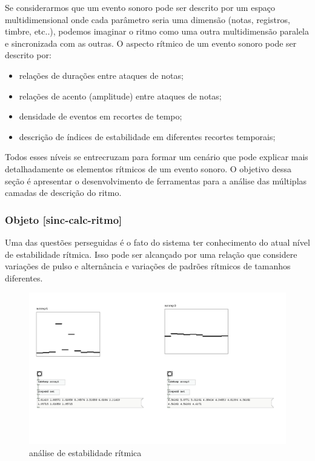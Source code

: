 \documentclass[draft]{ppgmus}
\begin{document}
Se considerarmos que um evento sonoro pode ser descrito por um espaço multidimensional
onde cada parâmetro seria uma dimensão (notas, registros, timbre, etc..), podemos
imaginar o ritmo como uma outra multidimensão paralela e sincronizada com as outras.
O aspecto rítmico de um evento sonoro pode ser descrito por:
\begin{itemize}
 \item relações de durações entre ataques de notas;
\item relações de acento (amplitude) entre ataques de notas;
\item densidade de eventos em recortes de tempo;
\item descrição de índices de estabilidade em diferentes recortes temporais;
\end{itemize}

Todos esses níveis se entrecruzam para formar um cenário que pode explicar mais detalhadamente
os elementos rítmicos de um evento sonoro. O objetivo dessa seção é apresentar o desenvolvimento de
ferramentas para a análise das múltiplas camadas de descrição do ritmo.


% 



\subsubsection{Objeto [sinc-calc-ritmo]}

Uma das questões perseguidas é o fato do sistema ter conhecimento do atual nível de 
estabilidade rítmica. Isso pode ser alcançado por uma relação que considere variações
de pulso e alternância e variações de padrões rítmicos de tamanhos diferentes.

\begin{figure}
\includegraphics[scale=.6]{prot5a}
\caption{análise de estabilidade rítmica}
\label{prot5a}
\end{figure} 
\end{document}
